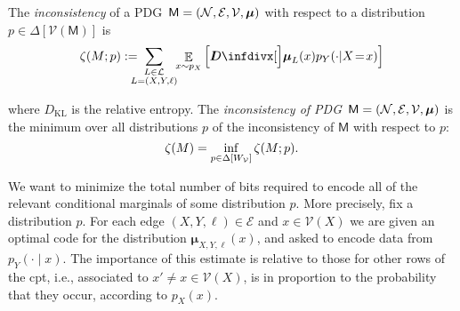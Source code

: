 \documentclass{article}
\def\sheq{\!=\!}
\newcommand{\bmu}{\boldsymbol{\mu}}
\newcommand{\V}{\mathcal V}
\newcommand{\Ed}{\mathcal E}
\newcommand{\sfM}{\mathsf M}
\newcommand{\MN}{PDG}
\numberwithin{equation}{section}
\begin{document}
	\begin{defn}\label{def:zeta-score}
       	  The \emph{inconsistency} of a \MN\ $\sfM = \mnvars[]$ with respect to a distribution $p \in \Delta[\V(\sfM)]$ is 
		\[
			\zeta(M ; p) := %
			\!\!\!\!\!\sum_{\substack{L \in \cal L\\L = (X,Y, \ell)}}\!\! \mathop{\mathbb E}_{x \sim p_X} \left[\kldiv[\Big]{\bmu_{L}(x) }{ p_Y(\cdot | X \sheq x) } \right]
		\]

		where $D_{\mathrm{KL}}$ is the relative entropy.
        The \emph{inconsistency of \MN\ $\sfM = \mnvars[]$} is the minimum over all distributions $p$ of the inconsistency of $\sfM$ with respect to $p$:
		\[ \zeta(M) = \inf_{ p \in \Delta [W_{\cal V}]}
\zeta (M; p) . \]
        \end{defn}

 	We want to minimize the total number of bits required to
        encode all of the relevant conditional marginals of some
        distribution $p$.  
 	More precisely, fix a distribution $p$. For each edge $(X, Y,
        \ell) \in \Ed$ and $x \in \V(X)$ we are given an optimal code
        for the distribution $\bmu_{X,Y,\ell}(x)$, and asked to encode
        data from $p_Y( \cdot \mid x)$.
        The importance of this
        estimate is relative to those for other rows of the cpt, i.e.,
        associated to $x' \neq x \in \V(X)$, is in proportion to the
        probability that they occur, according to $p_X(x)$. 
 		
\end{document}
